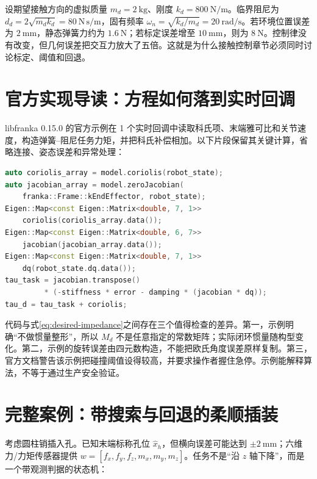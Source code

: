 设期望接触方向的虚拟质量 $m_d=2\ \mathrm{kg}$、刚度 $k_d=800\ \mathrm{N/m}$。临界阻尼为 $d_d=2\sqrt{m_dk_d}=80\ \mathrm{N\,s/m}$，固有频率 $\omega_n=\sqrt{k_d/m_d}=20\ \mathrm{rad/s}$。若环境位置误差为 $2\ \mathrm{mm}$，静态弹簧力约为 $1.6\ \mathrm{N}$；若标定误差增至 $10\ \mathrm{mm}$，则为 $8\ \mathrm{N}$。控制律没有改变，但几何误差把交互力放大了五倍。这就是为什么接触控制章节必须同时讨论标定、阈值和回退。

\section{官方实现导读：方程如何落到实时回调}

libfranka 0.15.0 的官方示例在 1 个实时回调中读取科氏项、末端雅可比和关节速度，构造弹簧--阻尼任务力矩，并把科氏补偿相加\cite{libfranka015}。以下片段保留其关键计算，省略连接、姿态误差和异常处理：

\begin{lstlisting}[language=C++,caption={libfranka 0.15.0 笛卡尔阻抗示例的关键力矩计算（Apache-2.0）}]
auto coriolis_array = model.coriolis(robot_state);
auto jacobian_array = model.zeroJacobian(
    franka::Frame::kEndEffector, robot_state);
Eigen::Map<const Eigen::Matrix<double, 7, 1>>
    coriolis(coriolis_array.data());
Eigen::Map<const Eigen::Matrix<double, 6, 7>>
    jacobian(jacobian_array.data());
Eigen::Map<const Eigen::Matrix<double, 7, 1>>
    dq(robot_state.dq.data());
tau_task = jacobian.transpose()
         * (-stiffness * error - damping * (jacobian * dq));
tau_d = tau_task + coriolis;
\end{lstlisting}

代码与式\eqref{eq:desired-impedance}之间存在三个值得检查的差异。第一，示例明确“不做惯量整形”，所以 $M_d$ 不是任意指定的常数矩阵；实际闭环惯量随构型变化。第二，示例的旋转误差由四元数构造，不能把欧氏角度误差原样复制。第三，官方文档警告该示例把碰撞阈值设得较高，并要求操作者握住急停。示例能解释算法，不等于通过生产安全验证。

\section{完整案例：带搜索与回退的柔顺插装}

考虑圆柱销插入孔。已知末端标称孔位 $\hat x_h$，但横向误差可能达到 $\pm2\ \mathrm{mm}$；六维力/力矩传感器提供 $w=[f_x,f_y,f_z,m_x,m_y,m_z]$。任务不是“沿 $z$ 轴下降”，而是一个带观测判据的状态机：

